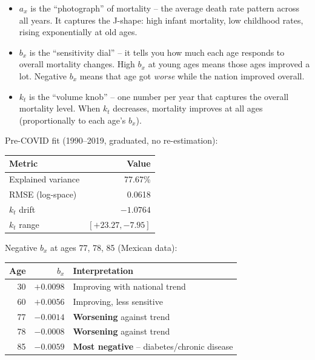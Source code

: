 \documentclass[11pt,a4paper]{article}
\theoremstyle{definition}
\begin{document}
\begin{intuition}
\begin{itemize}
  \item $a_x$ is the ``photograph'' of mortality -- the average death rate
    pattern across all years. It captures the J-shape: high infant mortality,
    low childhood rates, rising exponentially at old ages.
  \item $b_x$ is the ``sensitivity dial'' -- it tells you how much each age
    responds to overall mortality changes. High $b_x$ at young ages means
    those ages improved a lot. Negative $b_x$ means that age got \emph{worse}
    while the nation improved overall.
  \item $k_t$ is the ``volume knob'' -- one number per year that captures
    the overall mortality level. When $k_t$ decreases, mortality improves
    at all ages (proportionally to each age's $b_x$).
\end{itemize}
\end{intuition}

\begin{application}
Pre-COVID fit (1990--2019, graduated, no re-estimation):
\begin{center}
\begin{tabular}{lr}
\toprule
Metric & Value \\
\midrule
Explained variance & 77.67\% \\
RMSE (log-space) & 0.0618 \\
$k_t$ drift & $-1.0764$ \\
$k_t$ range & $[+23.27, -7.95]$ \\
\bottomrule
\end{tabular}
\end{center}

Negative $b_x$ at ages 77, 78, 85 (Mexican data):
\begin{center}
\begin{tabular}{rrl}
\toprule
Age & $b_x$ & Interpretation \\
\midrule
30 & $+0.0098$ & Improving with national trend \\
60 & $+0.0056$ & Improving, less sensitive \\
77 & $-0.0014$ & \textbf{Worsening} against trend \\
78 & $-0.0008$ & \textbf{Worsening} against trend \\
85 & $-0.0059$ & \textbf{Most negative} -- diabetes/chronic disease \\
\bottomrule
\end{tabular}
\end{center}
\end{application}
\end{document}
